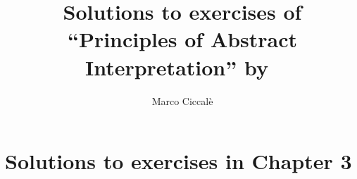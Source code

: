 \documentclass[10pt,nofonts]{tufte-handout}
\title{Solutions to exercises of ``Principles of Abstract Interpretation'' by~\citet{Cousot21-book}}
\author{Marco Ciccal{\`{e}}}
\begin{document}
%
\maketitle
%
\tableofcontents
%
\section{Solutions to exercises in Chapter 3}
%


\end{document}

